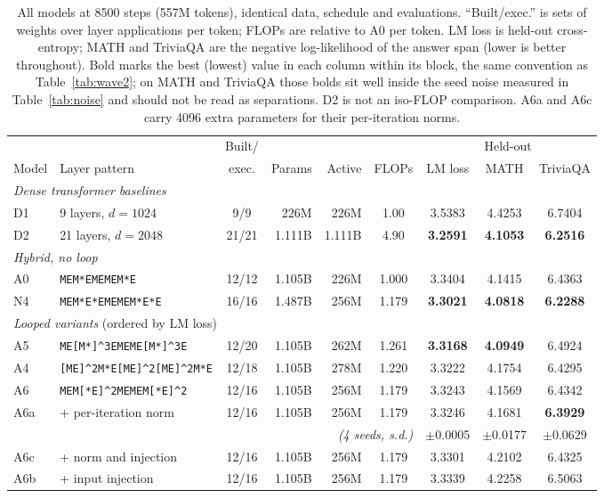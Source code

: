 \documentclass[11pt,a4paper]{article}
\newcommand{\lp}[1]{\texttt{#1}}
\newcommand{\caret}{\textasciicircum}
\begin{document}
\begin{table}[t]
\centering
\small
\setlength{\tabcolsep}{4pt}
\begin{tabular}{llcrrcccc}
\toprule
& & Built/ & & & & \multicolumn{3}{c}{Held-out} \\
\cmidrule(l){7-9}
Model & Layer pattern & exec. & Params & Active & FLOPs & LM loss & MATH & TriviaQA \\
\midrule
\multicolumn{9}{l}{\emph{Dense transformer baselines}} \\
D1 & 9 layers, $d{=}1024$   & 9/9   & 226M   & 226M   & 1.00 & 3.5383 & 4.4253 & 6.7404 \\
D2 & 21 layers, $d{=}2048$  & 21/21 & 1.111B & 1.111B & 4.90 & \textbf{3.2591} & \textbf{4.1053} & \textbf{6.2516} \\
\midrule
\multicolumn{9}{l}{\emph{Hybrid, no loop}} \\
A0 & \lp{MEM*EMEMEM*E}      & 12/12 & 1.105B & 226M & 1.000 & 3.3404 & 4.1415 & 6.4363 \\
N4 & \lp{MEM*E*EMEMEM*E*E}  & 16/16 & 1.487B & 256M & 1.179 & \textbf{3.3021} & \textbf{4.0818} & \textbf{6.2288} \\
\midrule
\multicolumn{9}{l}{\emph{Looped variants} (ordered by LM loss)} \\
A5 & \lp{ME[M*]\caret3EMEME[M*]\caret3E}            & 12/20 & 1.105B & 262M & 1.261 & \textbf{3.3168} & \textbf{4.0949} & 6.4924 \\
A4 & \lp{[ME]\caret2M*E[ME]\caret2[ME]\caret2M*E}   & 12/18 & 1.105B & 278M & 1.220 & 3.3222 & 4.1754 & 6.4295 \\
A6 & \lp{MEM[*E]\caret2MEMEM[*E]\caret2}            & 12/16 & 1.105B & 256M & 1.179 & 3.3243 & 4.1569 & 6.4342 \\
A6a & \quad + per-iteration norm                    & 12/16 & 1.105B & 256M & 1.179 & 3.3246 & 4.1681 & \textbf{6.3929} \\
    & \multicolumn{5}{r}{\emph{(4 seeds, s.d.)}}                                    & $\pm$0.0005 & $\pm$0.0177 & $\pm$0.0629 \\
A6c & \quad + norm and injection                    & 12/16 & 1.105B & 256M & 1.179 & 3.3301 & 4.2102 & 6.4325 \\
A6b & \quad + input injection                       & 12/16 & 1.105B & 256M & 1.179 & 3.3339 & 4.2258 & 6.5063 \\
\bottomrule
\end{tabular}
\caption{All models at 8500 steps (557M tokens), identical data, schedule and evaluations.
``Built/exec.'' is sets of weights over layer applications per token; FLOPs are relative to A0 per
token. LM loss is held-out cross-entropy; MATH and TriviaQA are the negative log-likelihood of the
answer span (lower is better throughout). Bold marks the best (lowest) value in each column within
its block, the same convention as Table~\ref{tab:wave2}; on MATH and TriviaQA those bolds sit well
inside the seed noise measured in Table~\ref{tab:noise} and should not be read as separations. D2 is
not an iso-FLOP comparison. A6a and A6c carry 4096 extra parameters for their per-iteration norms.}
\label{tab:main}
\end{table}
\end{document}
